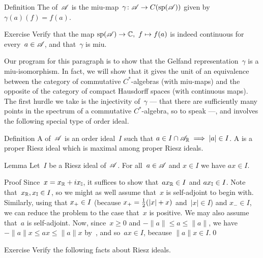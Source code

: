\documentclass[a]{subfiles}
\begin{document}
\begin{parsec}
\begin{point}{Definition}
The %
of~$\mathscr{A}$
is the miu-map~$\gamma\colon \mathscr{A}\to C(\mathrm{sp}(\mathscr{A}))$%
given by $\gamma(a)(f)=f(a)$.
\end{point}
\begin{point}{Exercise}%
Verify that 
 the map $\mathrm{sp}(\mathscr{A})\to \mathbb{C},\ f\mapsto f(a)$ is indeed
continuous for every~$a\in\mathscr{A}$,
and that~$\gamma$ is miu.
\end{point}
\begin{point}%
Our program for this paragraph is to show that
the Gelfand representation~$\gamma$ is 
a miu-isomorphism.
In fact,
we will show that it gives the unit
of an equivalence between the category of commutative $C^*$-algebras
(with miu-maps)
and the opposite of the category of compact Hausdorff spaces
(with continuous maps).
The first hurdle we take is the injectivity of~$\gamma$
--- that there are sufficiently many
points in the spectrum of a commutative $C^*$-algebra,
so to speak ---,
and involves
the following special type of order ideal.
\end{point}
\begin{point}{Definition}%
A %
of~$\mathscr{A}$
is an order ideal~$I$
such that $a\in I\cap\mathscr{A}_{\mathbb{R}}\implies \left|a\right|\in I$.
A %
is a proper Riesz ideal which is maximal among
proper Riesz ideals.
\end{point}
\begin{point}{Lemma}%
Let~$I$ be a Riesz ideal of~$\mathscr{A}$.
For all~$a\in \mathscr{A}$ and $x\in I$ we have $ax\in I$.
\begin{point}{Proof}%
Since~$x=x_{\mathbb{R}}+ix_{\mathbb{I}}$,
it suffices to show that~$ax_{\mathbb{R}}\in I$ and $ax_{\mathbb{I}}\in I$.
Note that~$x_{\mathbb{R}},x_{\mathbb{I}}\in I$,
so we might as well assume that~$x$ is self-adjoint to begin with.
Similarly, using that
 $x_{+}\in I$ (because $x_{+}=\frac{1}{2}(\left|x\right|+x)$
and~$\left|x\right|\in I$) and $x_-\in I$,
we can reduce the problem to the case that~$x$ is positive.
We may also assume that~$a$ is self-adjoint.
Now, since~$x\geq 0$ and $-\|a\|\leq a\leq \|a\|$,
we have $-\|a\|x \leq ax\leq \|a\|x$
by~,
and so~$ax\in I$,
because $\|a\|x\in I$.\qed
\end{point}
\end{point}
\begin{point}{Exercise}%
Verify the following facts about Riesz ideals.

\end{point}
\end{parsec}
\end{document}
